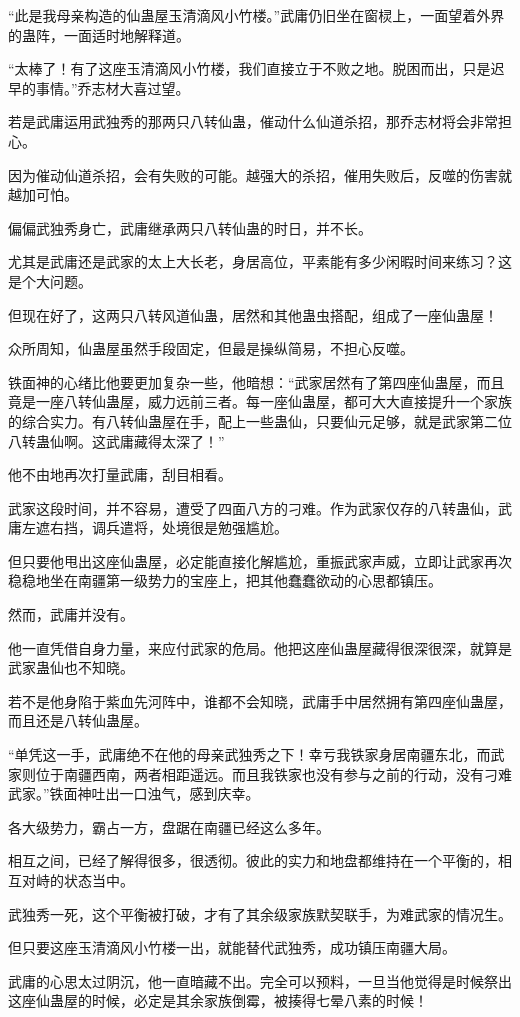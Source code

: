 \begin{this_body}
“此是我母亲构造的仙蛊屋玉清滴风小竹楼。”武庸仍旧坐在窗棂上，一面望着外界的蛊阵，一面适时地解释道。

“太棒了！有了这座玉清滴风小竹楼，我们直接立于不败之地。脱困而出，只是迟早的事情。”乔志材大喜过望。

若是武庸运用武独秀的那两只八转仙蛊，催动什么仙道杀招，那乔志材将会非常担心。

因为催动仙道杀招，会有失败的可能。越强大的杀招，催用失败后，反噬的伤害就越加可怕。

偏偏武独秀身亡，武庸继承两只八转仙蛊的时日，并不长。

尤其是武庸还是武家的太上大长老，身居高位，平素能有多少闲暇时间来练习？这是个大问题。

但现在好了，这两只八转风道仙蛊，居然和其他蛊虫搭配，组成了一座仙蛊屋！

众所周知，仙蛊屋虽然手段固定，但最是操纵简易，不担心反噬。

铁面神的心绪比他要更加复杂一些，他暗想：“武家居然有了第四座仙蛊屋，而且竟是一座八转仙蛊屋，威力远前三者。每一座仙蛊屋，都可大大直接提升一个家族的综合实力。有八转仙蛊屋在手，配上一些蛊仙，只要仙元足够，就是武家第二位八转蛊仙啊。这武庸藏得太深了！”

他不由地再次打量武庸，刮目相看。

武家这段时间，并不容易，遭受了四面八方的刁难。作为武家仅存的八转蛊仙，武庸左遮右挡，调兵遣将，处境很是勉强尴尬。

但只要他甩出这座仙蛊屋，必定能直接化解尴尬，重振武家声威，立即让武家再次稳稳地坐在南疆第一级势力的宝座上，把其他蠢蠢欲动的心思都镇压。

然而，武庸并没有。

他一直凭借自身力量，来应付武家的危局。他把这座仙蛊屋藏得很深很深，就算是武家蛊仙也不知晓。

若不是他身陷于紫血先河阵中，谁都不会知晓，武庸手中居然拥有第四座仙蛊屋，而且还是八转仙蛊屋。

“单凭这一手，武庸绝不在他的母亲武独秀之下！幸亏我铁家身居南疆东北，而武家则位于南疆西南，两者相距遥远。而且我铁家也没有参与之前的行动，没有刁难武家。”铁面神吐出一口浊气，感到庆幸。

各大级势力，霸占一方，盘踞在南疆已经这么多年。

相互之间，已经了解得很多，很透彻。彼此的实力和地盘都维持在一个平衡的，相互对峙的状态当中。

武独秀一死，这个平衡被打破，才有了其余级家族默契联手，为难武家的情况生。

但只要这座玉清滴风小竹楼一出，就能替代武独秀，成功镇压南疆大局。

武庸的心思太过阴沉，他一直暗藏不出。完全可以预料，一旦当他觉得是时候祭出这座仙蛊屋的时候，必定是其余家族倒霉，被揍得七晕八素的时候！

\end{this_body}

